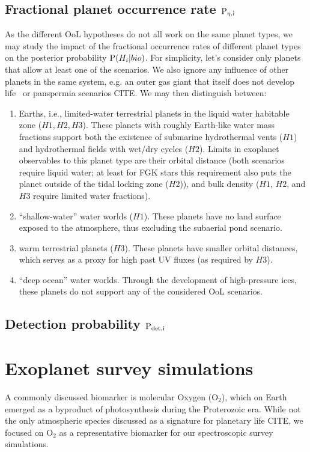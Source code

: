 \documentclass[twocolumn]{aastex631}
\begin{document}
\subsection{Fractional planet occurrence rate $\mathrm{P}_\mathrm{\eta, i}$}
As the different OoL hypotheses do not all work on the same planet types, we may study the impact of the fractional occurrence rates of different planet types on the posterior probability $\mathrm{P}(H_i|bio)$.
For simplicity, let's consider only planets that allow at least one of the scenarios.
We also ignore any influence of other planets in the same system, e.g. an outer gas giant that itself does not develop life~\citep{Schlecker2021a} or panspermia scenarios CITE.
We may then distinguish between:
\begin{enumerate}
    \item Earths, i.e., limited-water terrestrial planets in the liquid water habitable zone ($H1, H2, H3$). These planets with roughly Earth-like water mass fractions support both the existence of submarine hydrothermal vents ($H1$) and hydrothermal fields with wet/dry cycles ($H2$). Limits in exoplanet observables to this planet type are their orbital distance (both scenarios require liquid water; at least for FGK stars this requirement also puts the planet outside of the tidal locking zone ($H2$)), and bulk density ($H1$, $H2$, and $H3$ require limited water fractions). 
    \item ``shallow-water'' water worlds ($H1$). These planets have no land surface exposed to the atmosphere, thus excluding the subaerial pond scenario. 
    \item warm terrestrial planets ($H3$). These planets have smaller orbital distances, which serves as a proxy for high past UV fluxes (as required by $H3$). 
    \item ``deep ocean'' water worlds. Through the development of high-pressure ices, these planets do not support any of the considered OoL scenarios.
\end{enumerate}





\subsection{Detection probability $\mathrm{P}_\mathrm{det, i}$}


\section{Exoplanet survey simulations}
A commonly discussed biomarker is molecular Oxygen (O$_2$), which on Earth emerged as a byproduct of photosynthesis during the Proterozoic era. 
While not the only atmospheric species discussed as a signature for planetary life CITE, we focused on O$_2$ as a representative biomarker for our spectroscopic survey simulations. 
\end{document}

